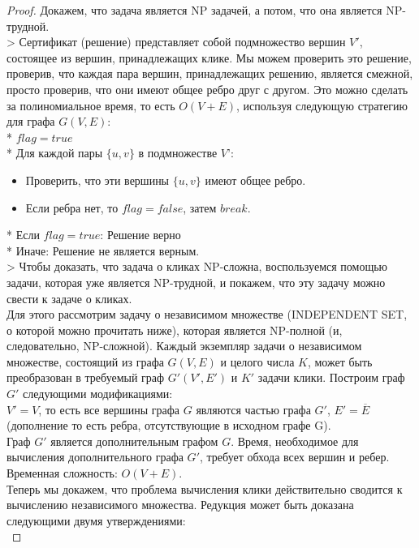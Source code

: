     \begin{proof}
        Докажем, что задача является \textsc{NP} задачей, а потом, что она является \textsc{NP}-трудной.\\
        > Сертификат (решение) представляет собой подмножество вершин $V'$, состоящее из вершин, принадлежащих клике. Мы можем проверить это решение, проверив, что каждая пара вершин, принадлежащих решению, является смежной, просто проверив, что они имеют общее ребро друг с другом. Это можно сделать за полиномиальное время, то есть $O(V + E)$, используя следующую стратегию для графа $G(V, E)$:\\
        * $flag = true$\\
        * Для каждой пары $\{u, v\}$ в подмножестве $V’$:
        \begin{itemize}
        \item Проверить, что эти вершины $\{u, v\}$ имеют общее ребро.
        \item Если ребра нет, то $flag = false$, затем $break$.
        \end{itemize}
        * Если $flag = true$: Решение верно\\
        * Иначе: Решение не является верным.\\
        > Чтобы доказать, что задача о кликах \textsc{NP}-сложна, воспользуемся помощью задачи, которая уже является \textsc{NP}-трудной, и покажем, что эту задачу можно свести к задаче о кликах.\\
        Для этого рассмотрим задачу о независимом множестве (\textsc{INDEPENDENT SET}, о которой можно прочитать ниже), которая является \textsc{NP}-полной (и, следовательно, \textsc{NP}-сложной). Каждый экземпляр задачи о независимом множестве, состоящий из графа $G(V, E)$ и целого числа $K$, может быть преобразован в требуемый граф $G'(V', E')$ и $K'$ задачи клики. Построим граф $G'$ следующими модификациями:\\
        $V' = V$, то есть все вершины графа $G$ являются частью графа $G'$, $E'= \overline{E}$ (дополнение то есть ребра, отсутствующие в исходном графе G).\\
        Граф $G'$ является дополнительным графом $G$. Время, необходимое для вычисления дополнительного графа $G'$, требует обхода всех вершин и ребер.
        Временная сложность: $O(V+E)$.\\
        Теперь мы докажем, что проблема вычисления клики действительно сводится к вычислению независимого множества. Редукция может быть доказана следующими двумя утверждениями:\\

\end{proof}
